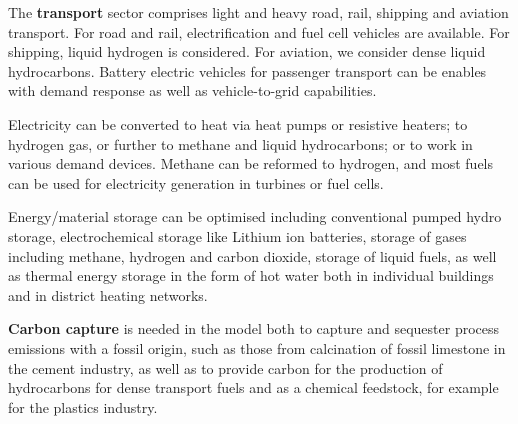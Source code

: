 The \textbf{transport} sector comprises light and heavy road, rail, shipping and
aviation transport. For road and rail, electrification and fuel cell vehicles are
available. For shipping, liquid hydrogen is considered. For aviation, we
consider dense liquid hydrocarbons. Battery electric vehicles for passenger
transport can be enables with demand response as well as vehicle-to-grid
capabilities.

Electricity can be converted to heat via heat pumps or resistive heaters; to
hydrogen gas, or further to methane and liquid hydrocarbons; or to work in
various demand devices. Methane can be reformed to hydrogen, and most fuels can
be used for electricity generation in turbines or fuel cells.

Energy/material storage can be optimised including conventional
pumped hydro storage, electrochemical storage like Lithium ion batteries,
storage of gases including methane, hydrogen and carbon dioxide, storage of
liquid fuels, as well as thermal energy storage in the form of hot water both in
individual buildings and in district heating networks.

\textbf{Carbon capture} is
needed in the model both to capture and sequester process emissions with a
fossil origin, such as those from calcination of fossil limestone in the cement
industry, as well as to provide carbon for the production of hydrocarbons for
dense transport fuels and as a chemical feedstock, for example for the plastics
industry.